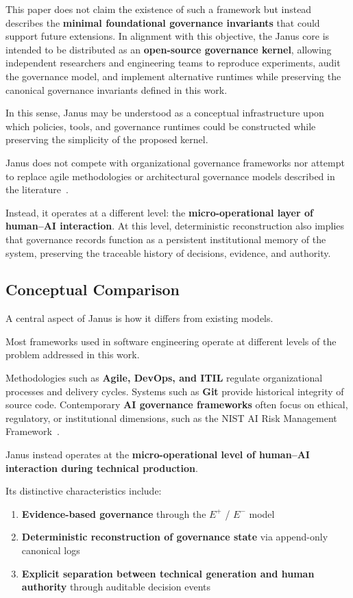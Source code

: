 \documentclass[conference]{IEEEtran}
\begin{document}
This paper does not claim the existence of such a framework but instead describes the \textbf{minimal foundational governance invariants} that could support future extensions. In alignment with this objective, the Janus core is intended to be distributed as an \textbf{open-source governance kernel}, allowing independent researchers and engineering teams to reproduce experiments, audit the governance model, and implement alternative runtimes while preserving the canonical governance invariants defined in this work.

In this sense, Janus may be understood as a conceptual infrastructure upon which policies, tools, and governance runtimes could be constructed while preserving the simplicity of the proposed kernel.

Janus does not compete with organizational governance frameworks nor attempt to replace agile methodologies or architectural governance models described in the literature~\cite{booch2006}.

Instead, it operates at a different level: the \textbf{micro-operational layer of human--AI interaction}. At this level, deterministic reconstruction also implies that governance records function as a persistent institutional memory of the system, preserving the traceable history of decisions, evidence, and authority.

\subsection{Conceptual Comparison}
A central aspect of Janus is how it differs from existing models.

Most frameworks used in software engineering operate at different levels of the problem addressed in this work.

Methodologies such as \textbf{Agile, DevOps, and ITIL} regulate organizational processes and delivery cycles. Systems such as \textbf{Git} provide historical integrity of source code. Contemporary \textbf{AI governance frameworks} often focus on ethical, regulatory, or institutional dimensions, such as the NIST AI Risk Management Framework~\cite{nist2023}.

Janus instead operates at the \textbf{micro-operational level of human--AI interaction during technical production}.

Its distinctive characteristics include:
\begin{enumerate}
  \item \textbf{Evidence-based governance} through the $E^{+}$ / $E^{-}$ model
  \item \textbf{Deterministic reconstruction of governance state} via append-only canonical logs
  \item \textbf{Explicit separation between technical generation and human authority} through auditable decision events
\end{enumerate}
\end{document}
